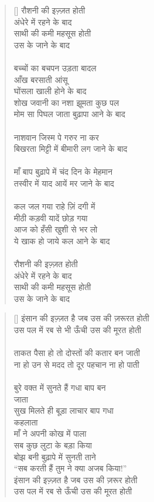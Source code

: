 \begin{verse}[\versewidth]\texthindi{
रौशनी की इज़्ज़त होती\\
अंधेरे में रहने के बाद\\
साथी की कमी महसूस होती\\
उस के जाने के बाद\\
\\
बच्चों का बचपन उड़ता बादल\\
आँख बरसाती आंसू\\
घोंसला खाली होने के बाद\\
शोख जवानी का नशा झूमता कुछ पल\\
मोम सा पिघल जाता बुढ़ापा आने के बाद\\
\\
नाशवान जिस्म पे गरुर ना कर\\
बिखरता मिट्टी में बीमारी लग जाने के बाद\\
\\
माँ बाप बुढ़ापे में चंद दिन के मेहमान\\
तस्वीर में याद आयें मर जाने के बाद\\
\\
कल जल गया राहे ज़िं दगी में\\
मीठी कड़वी यादें छोड़ गया\\
आज को हँसी खुशी से भर लो\\
ये खाक हो जाये कल आने के बाद\\
\\
रौशनी की इज़्ज़त होती\\
अंधेरे में रहने के बाद\\
साथी की कमी महसूस होती\\
उस के जाने के बाद
}\end{verse}

\begin{verse}[\versewidth]\texthindi{
इंसान की इज़्ज़त है जब उस की ज़रूरत होती\\
उस पल में रब से भी ऊँची उस की मूरत होती\\
\\
ताकत पैसा हो तो दोस्तों की कतार बन जाती\\
ना हो उन से मदद तो दूर पहचान ना हो पाती\\
\\
बुरे वक्त में सुनते हैं गधा बाप बन\\
जाता\\
सुख मिलते ही बूड़ा लाचार बाप गधा\\
कहलाता\\
माँ ने अपनी कोख में पाला\\
सब कुछ लुटा के बड़ा किया\\
बोझ बनी बुढ़ापे में सुनती ताने\\
“सब करती हैं तुम ने क्या अजब किया!”\\
इंसान की इज़्ज़त है जब उस की ज़रूर होती\\
उस पल में रब से ऊँची उस की मूरत होती
}\end{verse}

